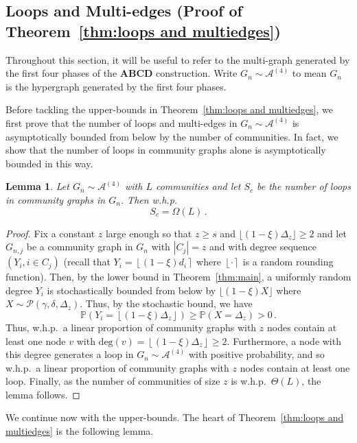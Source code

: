 \documentclass[12pt]{article}
\newtheorem{lemma}[theorem]{Lemma}
\theoremstyle{definition}
\theoremstyle{remark}
\theoremstyle{remark}
\numberwithin{theorem}{section}
\newcommand{\p}[1]{\mathbb{P}\left(#1\right)}
\newcommand{\abcdFour}{\ensuremath{\mathcal{A}^{(4)}}}
\newcommand{\round}[1]{\ensuremath{\left\lfloor #1 \right\rceil}}
\newcommand{\tpl}[3]{\ensuremath{\mathcal{P}\left(#1,#2,#3\right)}}
\begin{document}
\subsection{Loops and Multi-edges (Proof of Theorem~\ref{thm:loops and multiedges})}

Throughout this section, it will be useful to refer to the multi-graph generated by the first four phases of the \textbf{ABCD} construction. Write $G_n \sim \abcdFour$ to mean $G_n$ is the hypergraph generated by the first four phases.

Before tackling the upper-bounds in Theorem~\ref{thm:loops and multiedges}, we first prove that the number of loops and multi-edges in $G_n \sim \abcdFour$ is asymptotically bounded from below by the number of communities. In fact, we show that the number of loops in community graphs alone is asymptotically bounded in this way. 

\begin{lemma}\label{lem:loops and multiedges lowerbound}
Let $G_n \sim \abcdFour$ with $L$ communities and let $S_c$ be the number of loops in community graphs in $G_n$. Then w.h.p.\
\[
S_c = \Omega(L) \,.
\]
\end{lemma}
\begin{proof}
Fix a constant $z$ large enough so that $z \geq s$ and $\lfloor (1-\xi) \Delta_z \rfloor \geq 2$ and let $G_{n,j}$ be a community graph in $G_n$ with $|C_j| = z$ and with degree sequence $(Y_i, i \in C_j)$ (recall that $Y_i = \round{(1-\xi)d_i}$ where $\round{\cdot}$ is a random rounding function). Then, by the lower bound in Theorem~\ref{thm:main}, a uniformly random degree $Y_i$ is stochastically bounded from below by $\lfloor (1-\xi) X \rfloor$ where $X \sim \tpl{\gamma}{\delta}{\Delta_z}$. Thus, by the stochastic bound, we have
\[
\p{Y_i = \left\lfloor (1-\xi)\Delta_z \right\rfloor} 
\geq 
\p{X = \Delta_z}
> 0 \,.
\]
Thus, w.h.p.\ a linear proportion of community graphs with $z$ nodes contain at least one node $v$ with $\mathrm{deg}(v) = \left\lfloor (1-\xi)\Delta_z \right\rfloor \geq 2$. Furthermore, a node with this degree generates a loop in $G_n \sim \abcdFour$ with positive probability, and so w.h.p.\ a linear proportion of community graphs with $z$ nodes contain at least one loop. Finally, as the number of communities of size $z$ is w.h.p.\ $\Theta(L)$, the lemma follows. 
\end{proof}

We continue now with the upper-bounds. The heart of Theorem~\ref{thm:loops and multiedges} is the following lemma. 
\end{document}
